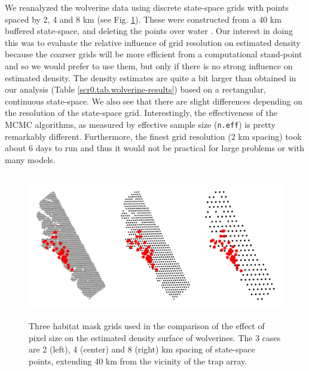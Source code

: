 We reanalyzed the wolverine data using discrete state-space grids with
points spaced by 2, 4 and 8 km (see
Fig. \ref{scr0.fig.wolvgrids}). These were constructed from a 40 km
buffered state-space, and deleting the points over water
\citep[see][]{royle_etal:2011jwm}.  Our interest in doing this was to
evaluate the relative influence of grid resolution on estimated
density because the coarser grids will be more efficient from a
computational stand-point and so we would prefer to use them, but
only if there is no strong influence on estimated density.
The density estimates are quite a bit larger than obtained in our
analysis
(Table \ref{scr0.tab.wolverine-results})
based on a rectangular, continuous state-space.
We also see that there are slight differences depending on the
resolution of the state-space grid.
Interestingly, the
effectiveness of the MCMC algorithms, as measured by effective sample
size (\mbox{\tt n.eff}) is pretty remarkably
different. Furthermore, the finest grid resolution ($2$ km spacing) took about
6 days to run and thus it would not be practical for large problems or
with many models.

\begin{figure}[ht]
\begin{center}
\includegraphics[height=2.5in,width=5in]{Ch4-SCR0/figs/wolvgrids}
\end{center}
\caption{Three habitat mask grids used in the comparison of the effect of pixel size on the estimated
  density surface of wolverines.  The 3 cases are
2 (left), 4 (center) and 8 (right) km spacing of state-space points, extending
40 km from the vicinity of the trap array. }
\label{scr0.fig.wolvgrids}
\end{figure}

